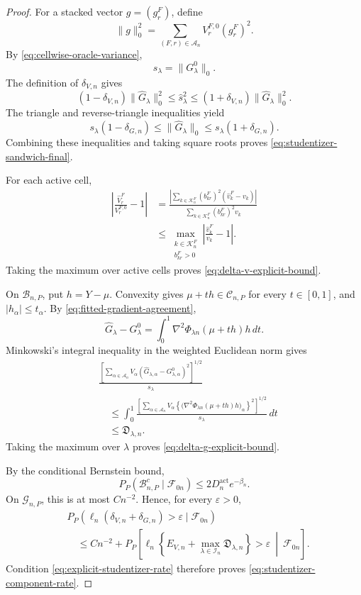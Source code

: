 \documentclass[11pt]{article}
\theoremstyle{definition}
\newcommand{\1}{\mathbf 1}\newcommand{\op}{\operatorname}
\begin{document}
\begin{proof}
For a stacked vector $g=(g_r^F)$, define
\[
\|g\|_0^2
=
\sum_{(F,r)\in\mathcal A_n}
V_r^{F,0}(g_r^F)^2.
\]
By \eqref{eq:cellwise-oracle-variance},
\[
s_\lambda=\|G_\lambda^0\|_0.
\]
The definition of $\delta_{V,n}$ gives
\[
(1-\delta_{V,n})\|\widehat G_\lambda\|_0^2
\le
\widehat s_\lambda^2
\le
(1+\delta_{V,n})\|\widehat G_\lambda\|_0^2.
\]
The triangle and reverse-triangle inequalities yield
\[
s_\lambda(1-\delta_{G,n})
\le
\|\widehat G_\lambda\|_0
\le
s_\lambda(1+\delta_{G,n}).
\]
Combining these inequalities and taking square roots proves
\eqref{eq:studentizer-sandwich-final}.

For each active cell,
\[
\begin{split}
\left|
\frac{\widehat V_r^F}{V_r^{F,0}}-1
\right|
&=
\frac{
\left|
\sum_{k\in\mathcal K_n^F}
(b_{kr}^F)^2(\widehat v_k^F-v_k)
\right|
}{
\sum_{k\in\mathcal K_n^F}
(b_{kr}^F)^2v_k
}\\
&\le
\max_{\substack{
k\in\mathcal K_n^F\\
b_{kr}^F>0}}
\left|
\frac{\widehat v_k^F}{v_k}-1
\right|.
\end{split}
\]
Taking the maximum over active cells proves
\eqref{eq:delta-v-explicit-bound}.

On $\mathcal B_{n,P}$, put $h=Y-\mu$. Convexity gives
$\mu+th\in\mathcal C_{n,P}$ for every $t\in[0,1]$, and
$|h_\alpha|\le t_\alpha$. By
\eqref{eq:fitted-gradient-agreement},
\[
\widehat G_\lambda-G_\lambda^0
=
\int_0^1
\nabla^2\Phi_{\lambda n}(\mu+th)h\,dt.
\]
Minkowski's integral inequality in the weighted Euclidean norm gives
\[
\begin{split}
&
\frac{
\left[
\sum_{\alpha\in\mathcal A_n}
V_\alpha
(\widehat G_{\lambda,\alpha}
-G_{\lambda,\alpha}^0)^2
\right]^{1/2}
}{s_\lambda}\\
&\quad\le
\int_0^1
\frac{
\left[
\sum_{\alpha\in\mathcal A_n}
V_\alpha
\left\{
\bigl(
\nabla^2\Phi_{\lambda n}(\mu+th)h
\bigr)_\alpha
\right\}^2
\right]^{1/2}
}{s_\lambda}\,dt\\
&\quad\le
\mathfrak D_{\lambda,n}.
\end{split}
\]
Taking the maximum over $\lambda$ proves
\eqref{eq:delta-g-explicit-bound}.

By the conditional Bernstein bound,
\[
P_P(\mathcal B_{n,P}^c\mid\mathcal F_{0n})
\le
2D_n^{\mathrm{act}}e^{-\beta_n}.
\]
On $\mathcal G_{n,P}$, this is at most $Cn^{-2}$. Hence, for every
$\varepsilon>0$,
\[
\begin{split}
&P_P\!\left(
\ell_n(\delta_{V,n}+\delta_{G,n})>\varepsilon
\mid\mathcal F_{0n}
\right)\\
&\quad\le
Cn^{-2}
+
P_P\!\left[
\ell_n
\left\{
E_{V,n}
+
\max_{\lambda\in\mathcal I_n}
\mathfrak D_{\lambda,n}
\right\}
>\varepsilon
\ \middle|\ \mathcal F_{0n}
\right].
\end{split}
\]
Condition \eqref{eq:explicit-studentizer-rate} therefore proves
\eqref{eq:studentizer-component-rate}.


\end{proof}
\end{document}
